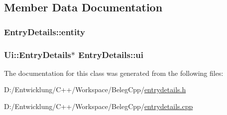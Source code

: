 \subsection{Member Data Documentation}
\hypertarget{class_entry_details_a8e6d1755f064f499cc5104aeb6985cb8}{
\subsubsection[{entity}]{ Entry\+Details\+::entity\hspace{0.3cm}{\ttfamily [private]}}}\label{class_entry_details_a8e6d1755f064f499cc5104aeb6985cb8}
\hypertarget{class_entry_details_ae27c7423d1a1f3bee14af21371700db7}{
\subsubsection[{ui}]{\setlength{\rightskip}{0pt plus 5cm}Ui\+::\+Entry\+Details$\ast$ Entry\+Details\+::ui\hspace{0.3cm}{\ttfamily [private]}}}\label{class_entry_details_ae27c7423d1a1f3bee14af21371700db7}


The documentation for this class was generated from the following files\+:\begin{DoxyCompactItemize}
\item 
D\+:/\+Entwicklung/\+C++/\+Workspace/\+Beleg\+Cpp/\hyperlink{entrydetails_8h}{entrydetails.\+h}\item 
D\+:/\+Entwicklung/\+C++/\+Workspace/\+Beleg\+Cpp/\hyperlink{entrydetails_8cpp}{entrydetails.\+cpp}\end{DoxyCompactItemize}
